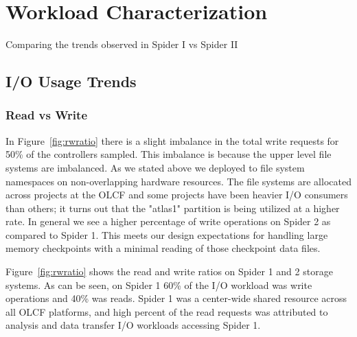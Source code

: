 \section{Workload Characterization}
\label{sec:workloadchar}



Comparing the trends observed in Spider I vs Spider II



\subsection{I/O Usage Trends}

\subsubsection{Read vs Write}

In Figure~\ref{fig:rwratio} there is a slight imbalance in the total write 
requests for 50\% of the controllers sampled. This imbalance is because the upper 
level file systems are imbalanced. As we stated above we deployed to file system 
namespaces on  non-overlapping hardware resources. The file systems are allocated 
across projects at the OLCF and some projects have been heavier I/O consumers than 
others; it turns out that the "atlas1" partition is being utilized at a higher rate.
In general we see a higher percentage of write operations on Spider 2 as compared
to Spider 1. This meets our design expectations for handling large memory checkpoints
with a minimal reading of those checkpoint data files.


Figure~\ref{fig:rwratio} shows the read and write ratios on Spider 1 and 2
storage systems. As can be seen, on Spider 1 60\% of the I/O workload was write
operations and 40\% was reads. Spider 1 was a center-wide shared resource
across all OLCF platforms, and high percent of the read requests was attributed
to analysis and data transfer I/O workloads accessing Spider 1. 

